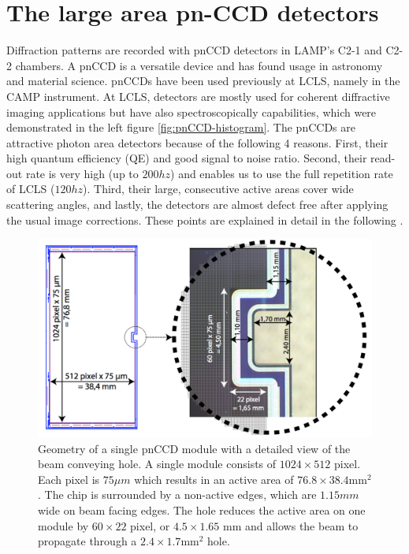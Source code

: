 \section{The large area pn-CCD detectors}\label{sec:pnCCD}
Diffraction patterns are recorded with pnCCD detectors in LAMP's C2-1 and C2-2 chambers. A pnCCD is a versatile device and has found usage in astronomy and material science. pnCCDs have been used previously at LCLS, namely in the CAMP instrument. At LCLS, detectors are mostly used for coherent diffractive imaging applications but have also spectroscopically capabilities, which were demonstrated in the left figure \ref{fig:pnCCD-histogram}. The pnCCDs are attractive photon area detectors because of the following 4 reasons. First, their high quantum efficiency (QE) and good signal to noise ratio. Second, their read-out rate is very high (up to $200hz$) and enables us to use the full repetition rate of LCLS ($120hz$). Third, their large, consecutive active areas cover wide scattering angles, and lastly, the detectors are almost defect free after applying the usual image corrections. These points are explained in detail in the following \citep{Bucher-2016-Unpublished}.\\
%
\begin{figure}
   \includegraphics[width=0.8\linewidth]{images/pnCCD-detail.png}
    \caption[Geometry of a single pnCCD module.]{Geometry of a single pnCCD module with a detailed view of the beam conveying hole. A single module consists of $1024 \times 512$ pixel. Each pixel is $75 \mu m$ which results in an active area of $76.8 \times 38.4 \mathrm{mm}^{2}$. The chip is surrounded by a non-active edges, which are $1.15 mm$ wide on beam facing edges. The hole reduces the active area on one module by $60\times 22$ pixel, or $4.5 \times 1.65$ mm and allows the beam to propagate through a $2.4 \times 1.7 \mathrm{mm}^{2}$ hole.}
\label{fig:ccd-detail}
\end{figure}
